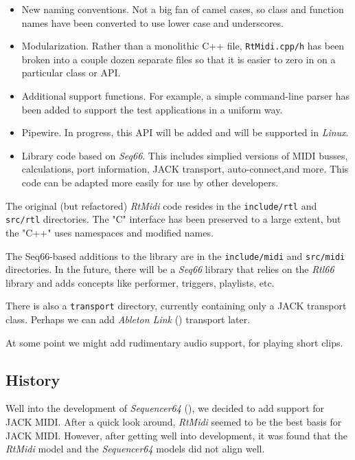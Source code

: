 \documentclass[
 11pt,
 twoside,
 a4paper,
 final                                 %
]{article}
\begin{document}
   \begin{itemize}
      \item New naming conventions.  Not a big fan of camel cases, so
         class and function names have been converted to use lower case
         and underscores.
      \item Modularization.  Rather than a monolithic C++ file,
         \texttt{RtMidi.cpp/h} has been broken into a couple dozen separate
         files so that it is easier to zero in on a particular class or
         API.
      \item Additional support functions.  For example, a simple command-line
         parser has been added to support the test applications in a uniform
         way.
      \item Pipewire.  In progress, this API will be added and will be
         supported in \textsl{Linux}.
      \item Library code based on \textsl{Seq66}.
         This includes simplied versions of MIDI busses, calculations,
         port information, JACK transport, auto-connect,and more.
         This code can be adapted more easily
         for use by other developers.
   \end{itemize}

   The original (but refactored) \textsl{RtMidi} code resides in the
   \texttt{include/rtl} and \texttt{src/rtl} directories.
   The "C" interface has been preserved to a large extent, but the
   "C++" uses namespaces and modified names.

   The Seq66-based additions to the library are in the
   \texttt{include/midi} and \texttt{src/midi} directories.
   In the future, there will be a \textsl{Seq66} library that
   relies on the \textsl{Rtl66} library and adds concepts like
   performer, triggers, playlists, etc.

   There is also a \texttt{transport} directory, currently containing only
   a JACK transport class.  Perhaps we can add \textsl{Ableton Link}
   (\cite{link}) transport later.

   At some point we might add rudimentary audio support, for playing
   short clips.

\subsection{History}
\label{subsec:history}

   Well into the development of \textsl{Sequencer64} (\cite{seq64}),
   we decided to add support for JACK MIDI.  After a quick look around,
   \textsl{RtMidi} seemed to be the best basis for JACK MIDI.  However, after
   getting well into development, it was found that the \textsl{RtMidi} model
   and the \textsl{Sequencer64} models did not align well.
\end{document}
